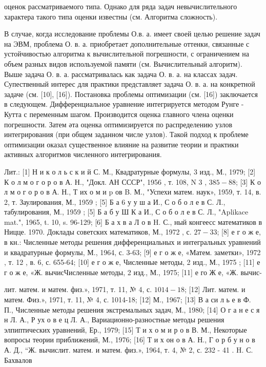\documentclass[10pt]{article}
\begin{document}
оценок рассматриваемого типа. Однако для ряда задач невычислительного характера такого типа оценки известны (см. Алгоритма сложность).



В случае, когда исследование проблемы О.в. а. имеет своей целью решение задач на ЭВМ, проблема О. в. а. приобретает дополнительные оттенки, связанные с устойчивостью алгоритма к вычислительной погрешности, с ограничением на объем разных видов используемой памяти (см. Вычислительный алгоритм). Выше задача О. в. а. рассматривалась как задача О. в. а. на классах задач. Супественный интерес для практики представляет задача О. в. а. на конкретной задаче (см. [10], [16]). Постановка проблемы оптимизации (см. [16]) заключается в следующем. Дифференциальное уравнение интегрируется методом Рунге - Кутта с переменным шагом. Производится оценка главного члена оценки погрешности. Затем әта оценка оптимизируется по распределению узлов интегрирования (при общем заданном числе узлов). Такой подход к проблеме оптимизации оказал существенное влияние на развитие теории и практики активных алгоритмов численного интегрирования.



Лит.: [1] Н и к о л ь с к и й С. М., Квадратурные формулы, 3 изд., М., 1979; [2] К о л м о г о р о в А. Н., "Докл. АН СССР", 1956 , т. 108, N 3 , $385-88$; [3] К о л м о г о р о в А. Н., Т их о м и $\mathrm{p}$ ов B. М., "Успехи матем. наук», 1959, т. 14, в. 2, т. Заулирования, М., 1959 ; [5] Б а 6 у у $ш$ а И., С о б о л е в С. Л., табулирования, М., 1959 ; [5] Б а б у Ш К а И., С о б о л е в С. Л., "Aplikace mat.", 1965, t. 10, s. 96-129; [6] Б а х в а Л о в H. С., ный конгеесс математиков в Ницце. 1970. Доклады советских математиков, М., 1972 , с. $27-33$; [8] е г о ж е, в кн.: Численные методы решения дифференциальных и интегральных уравнений и квадратурные формулы, М., 1964, с. 3-63; [9] е г о ж е, «Матем. заметки», 1972 , т. 12 , в. 6, с. 655-64; [10] е г о ж е, Численные методы, 2 изд., М., 1975 ; [11] е г о ж е, «Ж. вычисЧисленные методы, 2 изд., М., 1975; [11] е го Ж е, «Ж. вычис-

лит. матем. и матем. физ.», 1971, т. 11, № 4, с. $1014-18$; [12] Лит. матем. и матем. Физ.», 1971, т. 11, № 4, с. 1014-18; [12] М., 1967; [13] В а си л ь е в Ф. П., Численные методы решения экстремальных задач, М., 1980; [14] О г а н е с я н Л. А., Р ух о в е ц Л. А., Вариационно-разностные методы решения элпиптических уравнений, Ер., 1979; [15] Т и х о м и р о в В. М., Некоторые вопросы теории приближений, М., 1976; [16] Т и х он о в А. Н., Г о р б у н о в А. Д., “Ж. вычислит. матем. и матем. физ.», 1964, т. 4, № 2, с. 232 - 41 . H. С. Бахвалов
\end{document}
